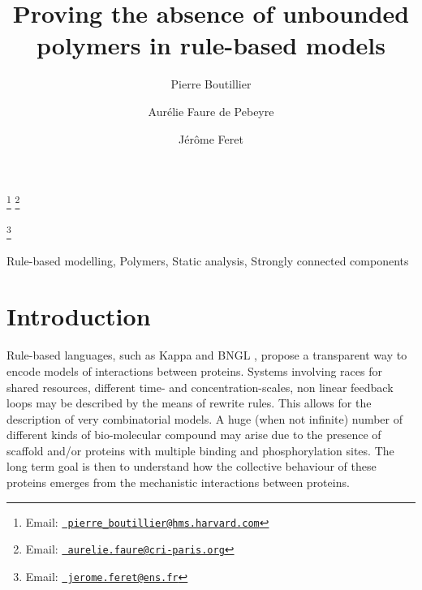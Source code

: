 \documentclass{entcs}
\begin{document}
\begin{frontmatter}
  \title{Proving the absence of unbounded polymers in rule-based models} \author{Pierre Boutillier}
  \address{Harvard Medical School, \\ Department of Systems Biology, Boston, MA 02115, USA}
  \author{Aur\'elie Faure de Pebeyre}
\address{Centre de recherche interdisciplinaire, 75004 Paris, France}
\address{INRIA, \\ Centre de recherche INRIA de Paris, 75 012 Paris, France}
\address{D\'{e}partement d'informatique de l'\'{E}cole normale sup\'{e}rieure,\\
\'Ecole normale sup\'erieure, CNRS, PSL Research University,
75 005 Paris, France}
  \author{J\'{e}r\^{o}me Feret}
  \address{INRIA, \\ Centre de recherche INRIA de Paris, 75 012 Paris, France}
  \address{D\'{e}partement d'informatique de l'\'{E}cole normale sup\'{e}rieure,\\
  \'Ecole normale sup\'erieure, CNRS, PSL Research University,
  75 005 Paris, France}
\thanks[pbemail]{Email:
    \href{mailto:pierre\_boutillier@hms.harvard.com} {\texttt{\normalshape
        pierre\_boutillier@hms.harvard.com}}}
\thanks[afemail]{Email:
            \href{mailto:aurelie.faure@cri-paris.org} {\texttt{\normalshape
        aurelie.faure@cri-paris.org}}}

\thanks[jfemail]{Email:
    \href{mailto:jerome.feret@ens.fr} {\texttt{\normalshape
        jerome.feret@ens.fr}}}
\begin{abstract}

\end{abstract}
\begin{keyword}
  Rule-based modelling,
Polymers,
Static analysis,
Strongly connected components
\end{keyword}
\end{frontmatter}

\section{Introduction}

Rule-based languages, such as Kappa \cite{DBLP:journals/tcs/DanosL04} and BNGL \cite{BNGL}, propose a transparent way to encode models of interactions between proteins.  Systems involving races for shared resources, different time- and concentration-scales, non linear feedback loops may be described by the means of rewrite rules. This allows for the description of very combinatorial models. A huge (when not infinite) number of different kinds of bio-molecular compound may arise due to the presence of scaffold and/or proteins with multiple binding and phosphorylation sites. The long term goal is then to understand how the collective behaviour of these proteins emerges from the mechanistic interactions between proteins.
\end{document}
